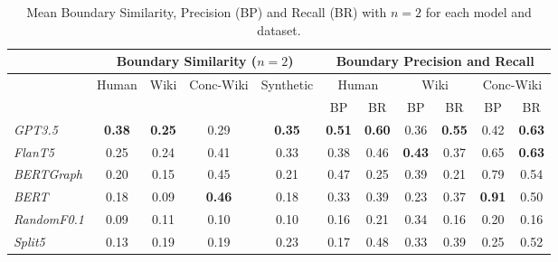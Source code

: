 \begin{table*}[t]
    \centering
    \begin{tabular}{@{}lcccc@{\hspace{2em}}ccccc@{\hspace{0.2em}}c@{}}
    \toprule
    & \multicolumn{4}{c}{Boundary Similarity ($n=2$)} & \multicolumn{6}{c}{Boundary Precision and Recall} \\ 
    \midrule
    & Human & Wiki & Conc-Wiki & Synthetic & \multicolumn{2}{c}{Human} & \multicolumn{2}{c}{Wiki} & \multicolumn{2}{c}{Conc-Wiki} \\ 
    &  &  &  &  & BP & BR & BP & BR & BP & BR \\
    \midrule
    \it GPT3.5  & \bf 0.38 & \bf 0.25 & 0.29 & \bf 0.35 & \bf 0.51 & \bf 0.60 & 0.36 & \bf 0.55 & 0.42 & \bf 0.63 \\ 
    \it FlanT5  & 0.25 & 0.24 & 0.41 & 0.33 & 0.38 & 0.46 & \bf 0.43 & 0.37 & 0.65 & \bf 0.63 \\ 
    \midrule
    \it BERTGraph   & 0.20 & 0.15 & 0.45 & 0.21 & 0.47 & 0.25 & 0.39 & 0.21 & 0.79 & 0.54 \\ 
    \it BERT    & 0.18 & 0.09 & \bf 0.46 & 0.18 & 0.33 & 0.39 & 0.23 & 0.37 & \bf 0.91 & 0.50 \\ 
    \it RandomF0.1 & 0.09 & 0.11 & 0.10 & 0.10 & 0.16 & 0.21 & 0.34 & 0.16 & 0.20 & 0.16 \\ 
    \it Split5  & 0.13 & 0.19 & 0.19 & 0.23 & 0.17 & 0.48 & 0.33 & 0.39 & 0.25 & 0.52 \\ 
    \bottomrule
    \end{tabular}
    \caption{Mean Boundary Similarity, Precision (BP) and Recall (BR) with $n=2$ for each model and dataset.}~\label{tab:combined_results}
    \vspace{-2em}
\end{table*}


